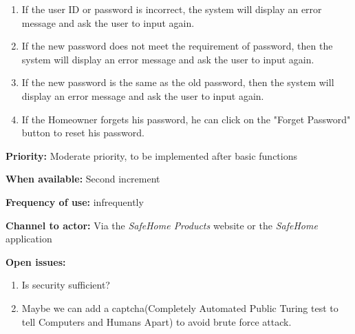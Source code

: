 \documentclass[twoside,11pt]{article}
\begin{document}
\begin{center}
{{\begin{multicols}{2}
                \begin{enumerate}
                    \item If the user ID or password is incorrect, the system will display an error message and ask the user to input again.
                    \item If the new password does not meet the requirement of password, then the system will display an error message and ask the user to input again.
                    \item If the new password is the same as the old password, then the system will display an error message and ask the user to input again.
                    \item If the Homeowner forgets his password, he can click on the "Forget Password" button to reset his password.
                \end{enumerate}

                \textbf{Priority:} Moderate priority, to be implemented after basic functions

                \textbf{When available:} Second increment

                \textbf{Frequency of use:} infrequently

                \textbf{Channel to actor:} Via the \emph{SafeHome Products} website or the \emph{SafeHome} application

                \textbf{Open issues:}

                \begin{enumerate}
                    \item Is security sufficient?
                    \item Maybe we can add a captcha(Completely Automated Public Turing test to tell Computers and Humans Apart) to avoid brute force attack.
                \end{enumerate}

            \end{multicols}}}
\end{center}
\newpage
\end{document}

